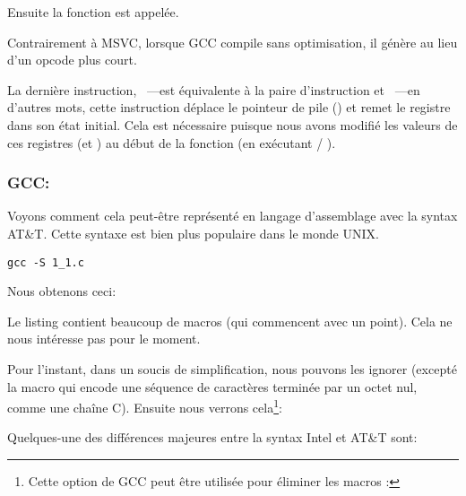 Ensuite la fonction \printf est appelée.

Contrairement à MSVC, lorsque GCC compile sans optimisation, il génère  au lieu d'un opcode plus court.

La dernière instruction, \LEAVE~---est équivalente à la paire d'instruction  et ~---en d'autres mots,
cette instruction déplace le \gls{pointeur de pile} (\ESP) et remet le registre \EBP dans son état initial.
Cela est nécessaire puisque nous avons modifié les valeurs de ces registres (\ESP et \EBP) au début de la fonction (en exécutant  / ).

\subsubsection{GCC: \ATTSyntax}
\label{ATT_syntax}

Voyons comment cela peut-être représenté en langage d'assemblage avec la syntax AT\&T.
Cette syntaxe est bien plus populaire dans le monde UNIX.

\begin{lstlisting}[caption=compilons avec GCC 4.7.3]
gcc -S 1_1.c
\end{lstlisting}

Nous obtenons ceci:



Le listing contient beaucoup de macros (qui commencent avec un point). Cela ne nous intéresse pas pour le moment.

Pour l'instant, dans un soucis de simplification, nous pouvons les ignorer (excepté la macro 
qui encode une séquence de caractères terminée par un octet nul, comme une chaîne C).
Ensuite nous verrons cela\footnote{Cette option de GCC peut être utilisée pour éliminer les macros :
}:



\myindex{\ATTSyntax}
\myindex{\IntelSyntax}
Quelques-une des différences majeures entre la syntax Intel et AT\&T sont:

